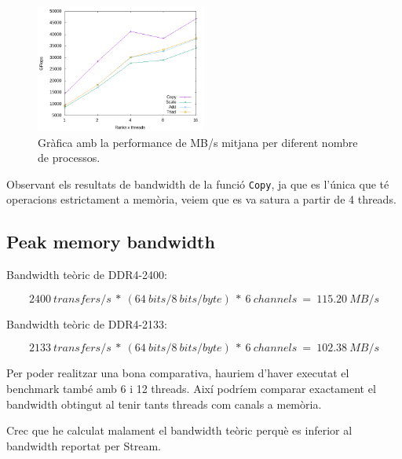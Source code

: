 \begin{figure}[h]
    \centering
    \includegraphics[width=0.5\textwidth]{img/stream_nobinding_grafica.png}
    \caption{Gràfica amb la performance de MB/s mitjana per diferent nombre de processos.}
    \label{fig:stream_nobinding_perf}
\end{figure}

Observant els resultats de bandwidth de la funció \texttt{Copy}, ja que es l'única que té operacions estrictament a memòria, veiem que es va satura a partir de 4 threads.

\subsection{Peak memory bandwidth}

Bandwidth teòric de DDR4-2400:

\[2400\ transfers/s\ *\ (64\ bits/8\ bits/byte)\ *\ 6\ channels\ =\ 115.20\ MB/s\]

Bandwidth teòric de DDR4-2133:

\[2133\ transfers/s\ *\ (64\ bits/8\ bits/byte)\ *\ 6\ channels\ =\ 102.38\ MB/s\]

Per poder realitzar una bona comparativa, hauriem d'haver executat el benchmark també amb 6 i 12 threads.
Així podríem comparar exactament el bandwidth obtingut al tenir tants threads com canals a memòria.

Crec que he calculat malament el bandwidth teòric perquè es inferior al bandwidth reportat per Stream.


